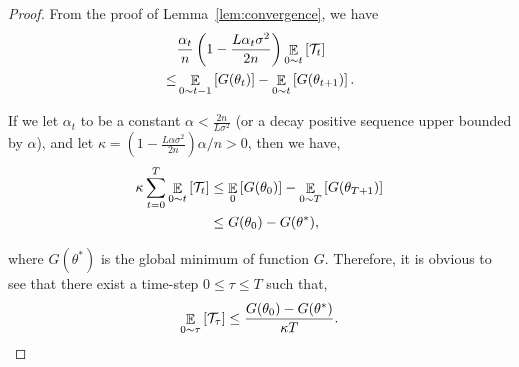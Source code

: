 \begin{proof}
From the proof of Lemma~\ref{lem:convergence}, we have
\begin{align}
&\frac{\alpha_t}{n} \left(1 - \frac{L \alpha_t \sigma^2}{2n} \right) \EEsub{\mathcal{T}_t}{0 \sim t} \\
\leq& \EEsub{G(\theta_t)}{0 \sim t-1} - \EEsub{G(\theta_{t+1})}{0 \sim t}.
\end{align}

If we let $\alpha_t$ to be a constant $\alpha < \frac{2n}{L\sigma^2}$ (or a decay positive sequence
upper bounded by $\alpha$), and let $\kappa = \left(1 - \frac{L \alpha \sigma^2}{2n} \right)\alpha/n
> 0$, then we have,
\begin{align}
 \kappa \sum_{t=0}^T \EEsub{\mathcal{T}_t}{0 \sim t} &\leq \EEsub{G(\theta_0)}{0} - \EEsub{G(\theta_{T+1})}{0 \sim T}\\
  &\leq G(\theta_0) - G(\theta^*),
\end{align}

where $G(\theta^*)$ is the global minimum of function $G$. Therefore, it is obvious to see that
there exist a time-step $ 0 \leq \tau \leq T$ such that,
\begin{align}
\EEsub{\mathcal{T}_{\tau}}{0 \sim \tau} \leq \frac{G(\theta_0) - G(\theta^*)}{\kappa T}.
\end{align}


\end{proof}

